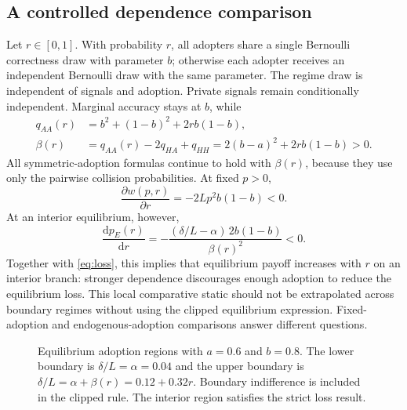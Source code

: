 \documentclass[11pt,a4paper]{article}
\theoremstyle{definition}
\theoremstyle{remark}
\begin{document}
\subsection{A controlled dependence comparison}
Let $r\in[0,1]$. With probability $r$, all adopters share a single Bernoulli correctness draw with parameter $b$; otherwise each adopter receives an independent Bernoulli draw with the same parameter. The regime draw is independent of signals and adoption. Private signals remain conditionally independent. Marginal accuracy stays at $b$, while
\begin{align}
 q_{AA}(r)&=b^2+(1-b)^2+2rb(1-b),\\
 \beta(r)&=q_{AA}(r)-2q_{HA}+q_{HH}
           =2(b-a)^2+2rb(1-b)>0.\label{eq:betar}
\end{align}
All symmetric-adoption formulas continue to hold with $\beta(r)$, because they use only the pairwise collision probabilities. At fixed $p>0$,
\begin{equation}
 \frac{\partial w(p,r)}{\partial r}=-2Lp^2b(1-b)<0.
\end{equation}
At an interior equilibrium, however,
\begin{equation}
 \frac{\mathrm d p_E(r)}{\mathrm d r}
 =-\frac{(\delta/L-\alpha)\,2b(1-b)}{\beta(r)^2}<0.
\end{equation}
Together with \eqref{eq:loss}, this implies that equilibrium payoff increases with $r$ on an interior branch: stronger dependence discourages enough adoption to reduce the equilibrium loss. This local comparative static should not be extrapolated across boundary regimes without using the clipped equilibrium expression. Fixed-adoption and endogenous-adoption comparisons answer different questions.


\begin{figure}[tb]
\centering
{}
\caption{Equilibrium adoption regions with $a=0.6$ and $b=0.8$. The lower boundary is $\delta/L=\alpha=0.04$ and the upper boundary is $\delta/L=\alpha+\beta(r)=0.12+0.32r$. Boundary indifference is included in the clipped rule. The interior region satisfies the strict loss result.}\label{fig:regions}
\end{figure}
\end{document}
